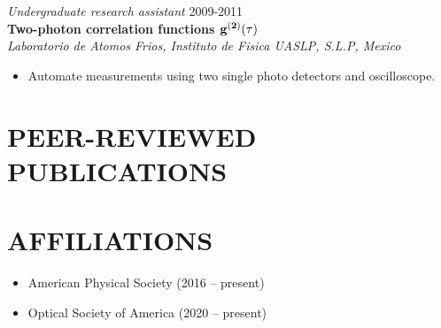 \documentclass[margin]{res} %
\begin{document}
\begin{resume}
{\sl Undergraduate research assistant} \hfill 2009-2011 \\
{\bf Two-photon correlation functions $\bf g^{(2)}(\tau)$}\\
{\it Laboratorio de Atomos Frios, Instituto de Fisica UASLP, S.L.P, Mexico}
\begin{itemize} \itemsep -2pt
\item Automate measurements using two single photo detectors and oscilloscope.
\end{itemize}
 
\end{resume}

\section{PEER-REVIEWED PUBLICATIONS}

\nocite{*}

\printbibliography[heading=none, keyword={peer}]




\section{AFFILIATIONS}
 
\begin{itemize}
    \item{American Physical Society (2016 -- present)}
    \item{Optical Society of America (2020 -- present)}
\end{itemize}
\end{document}
